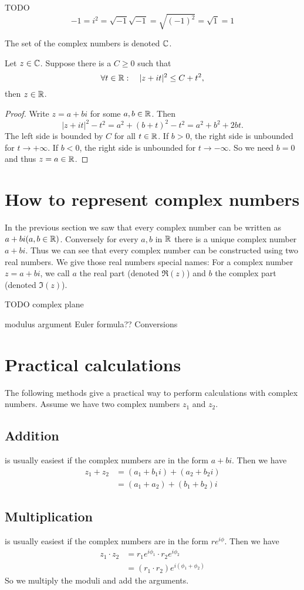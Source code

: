 TODO
\[ -1 = i^2 = \sqrt{-1}\sqrt{-1} = \sqrt{(-1)^2} = \sqrt{1} = 1 \]


The set of the complex numbers is denoted $\mathbb{C}$.

\begin{lemma} \label{boundedThenReal}
Let $z\in\mathbb{C}$. Suppose there is a $C\geq 0$ such that
\[ \forall t\in\mathbb{R}: \quad |z+it|^2\leq C+t^2, \]
then $z\in \mathbb{R}$.
\end{lemma}
\begin{proof}
Write $z = a+bi$ for some $a,b\in \mathbb{R}$. Then
\[ |z+it|^2-t^2 = a^2 + (b+t)^2 - t^2 = a^2+b^2+2bt. \]
The left side is bounded by $C$ for all $t\in\mathbb{R}$. If $b>0$, the right side is unbounded for $t\to +\infty$. If $b<0$, the right side is unbounded for $t\to -\infty$. So we need $b=0$ and thus $z=a\in\mathbb{R}$.
\end{proof}

\section{How to represent complex numbers}
In the previous section we saw that every complex number can be written as $a + bi (a,b \in \mathbb{R})$. Conversely for every $a,b $ in $\mathbb{R}$ there is a unique complex number $a + bi$. Thus we can see that every complex number can be constructed using two real numbers. We give those real numbers special names: For a complex number $z = a + bi$, we call $a$ the real part (denoted $\Re(z)$) and $b$ the complex part (denoted $\Im(z)$).

TODO complex plane

modulus argument
Euler formula??
Conversions

\section{Practical calculations}
The following methods give a practical way to perform calculations with complex numbers. Assume we have two complex numbers $z_1$ and $z_2$. 
\subsection{Addition} is usually easiest if the complex numbers are in the form $a+bi$. Then we have
\begin{align*}
z_1 + z_2 &= (a_1 + b_1i) + (a_2 + b_2i) \\
&= (a_1+a_2) + (b_1+b_2)i
\end{align*} 
\subsection{Multiplication} is usually easiest if the complex numbers are in the form $re^{i\phi}$. Then we have
\begin{align*}
z_1 \cdot z_2 &= r_1e^{i\phi_1}\cdot r_2e^{i\phi_2} \\
&= (r_1\cdot r_2)e^{i(\phi_1+\phi_2)}
\end{align*}
So we multiply the moduli and add the arguments.
